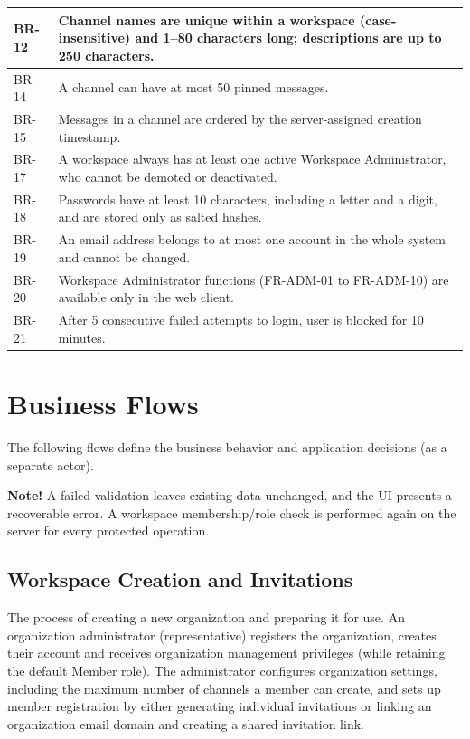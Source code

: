 \documentclass[
    english, %
]{VUMIFPSkursinis}
\begin{document}
\begin{longtable}{|p{}|p{}|}
BR-12 & Channel names are unique within a workspace (case-insensitive) and 1--80 characters long; descriptions are up to 250 characters. \\ \hline
BR-14 & A channel can have at most 50 pinned messages. \\ \hline
BR-15 & Messages in a channel are ordered by the server-assigned creation timestamp. \\ \hline
BR-17 & A workspace always has at least one active Workspace Administrator, who cannot be demoted or deactivated. \\ \hline
BR-18 & Passwords have at least 10 characters, including a letter and a digit, and are stored only as salted hashes. \\ \hline
BR-19 & An email address belongs to at most one account in the whole system and cannot be changed. \\ \hline
BR-20 & Workspace Administrator functions (FR-ADM-01 to FR-ADM-10) are available only in the web client. \\ \hline
BR-21 & After 5 consecutive failed attempts to login, user is blocked for 10 minutes. \\ \hline
\end{longtable}


\section{Business Flows}

The following flows define the business behavior and application decisions (as a separate actor).

\vspace{0.5\baselineskip}
\textbf{Note!} A failed validation leaves existing data unchanged, and the UI presents a recoverable error. A workspace membership/role check is performed again on the server for every protected operation.

\subsection{Workspace Creation and Invitations}
The process of creating a new organization and preparing it for use. An organization administrator (representative) registers the organization, creates their account and receives organization management privileges (while retaining the default Member role). The administrator configures organization settings, including the maximum number of channels a member can create, and sets up member registration by either generating individual invitations or linking an organization email domain and creating a shared invitation link.
\end{document}
